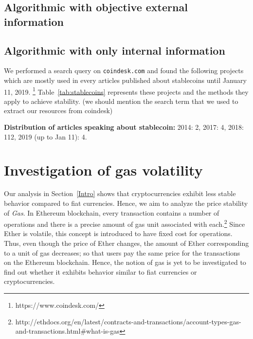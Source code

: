 \subsection{Algorithmic with objective external information}

\subsection{Algorithmic with only internal information}

We performed a search query on \texttt{coindesk.com} and found the following projects which are mostly used in every articles published about stablecoins until January 11, 2019. \footnote{https://www.coindesk.com/} Table~\ref{tab:stablecoins} represents these projects and the methods they apply to achieve stability. (we should mention the search term that we used to extract our resources from coindesk)


\textbf{Distribution of articles speaking about stablecoin:} 2014: 2, 2017: 4, 2018: 112, 2019 (up to Jan 11): 4.



\section{Investigation of gas volatility}
 \par
Our analysis in Section~\ref{Intro} shows that cryptocurrencies exhibit less stable behavior compared to fiat currencies. Hence, we aim to analyze the price stability of \emph{Gas}. In Ethereum blockchain, every transaction contains a number of operations and there is a precise amount of gas unit associated with each.\footnote{http://ethdocs.org/en/latest/contracts-and-transactions/account-types-gas-and-transactions.html\#what-is-gas} Since Ether is volatile, this concept is introduced to have fixed cost for operations. Thus, even though the price of Ether changes, the amount of Ether corresponding to a unit of gas decreases; so that users pay the same price for the transactions on the Ethereum blockchain. Hence, the notion of gas is yet to be investigated to find out whether it exhibits behavior similar to fiat currencies or cryptocurrencies.

